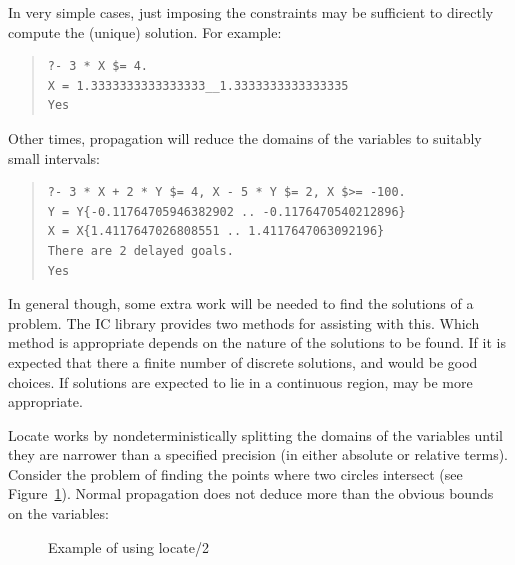 In very simple cases, just imposing the constraints may be sufficient to
directly compute the (unique) solution.  For example:

\begin{quote}\begin{verbatim}
?- 3 * X $= 4.
X = 1.3333333333333333__1.3333333333333335
Yes
\end{verbatim}\end{quote}

Other times, propagation will reduce the domains of the variables to
suitably small intervals:

\begin{quote}\begin{verbatim}
?- 3 * X + 2 * Y $= 4, X - 5 * Y $= 2, X $>= -100.
Y = Y{-0.11764705946382902 .. -0.1176470540212896}
X = X{1.4117647026808551 .. 1.4117647063092196}
There are 2 delayed goals.
Yes
\end{verbatim}\end{quote}

In general though, some extra work will be needed to find the solutions of a
problem.  The IC library provides two methods for assisting with this.
Which method is appropriate depends on the nature of the solutions to be
found.  If it is expected that there a finite number of discrete solutions,
 and
 would be good choices.  If
solutions are expected to lie in a continuous region,
 may be more appropriate.

Locate works by nondeterministically splitting the domains of the variables
until they are narrower than a specified precision (in either absolute or
relative terms).  Consider the problem of finding the points where two
circles intersect (see Figure~\ref{locatefig}).  Normal propagation does not
deduce more than the obvious bounds on the variables:

\begin{figure}
\begin{center}
\end{center}
\caption{Example of using locate/2}
\label{locatefig}
\end{figure}

